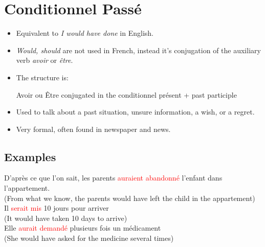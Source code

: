 \documentclass{book}
\begin{document}
\chapter{Conditionnel Passé}
    \begin{itemize}
        \item Equivalent to \textit{I would have done} in English.
        \item \textit{Would, should} are not used in French, instead it's conjugation of the auxiliary verb \textit{avoir} or \textit{être}.
        \item The structure is:
            \begin{center}
                Avoir ou Être conjugated in the conditionnel présent + past participle
            \end{center}
        \item Used to talk about a past situation, unsure information, a wish, or a regret.
        \item Very formal, often found in newspaper and news.
    \end{itemize}

    \section{Examples}
        \begin{center}
            D'après ce que l'on sait, les parents \textcolor{red}{auraient abandonné} l'enfant dans l'appartement. \\
            (From what we know, the parents would have left the child in the appartement) \\
            Il \textcolor{red}{serait mis} 10 jours pour arriver \\
            (It would have taken 10 days to arrive) \\
            Elle \textcolor{red}{aurait demandé} plusieurs fois un médicament \\
            (She would have asked for the medicine several times)
        \end{center}
\end{document}
